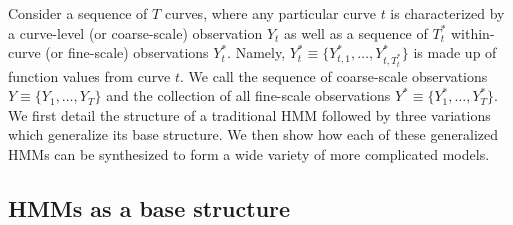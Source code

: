 
Consider a sequence of $T$ curves, where any particular curve $t$ is characterized by a curve-level (or coarse-scale) observation $Y_t$ as well as a sequence of $T^*_t$ within-curve (or fine-scale) observations $Y^*_{t}$. Namely, $Y^*_{t} \equiv \big\{Y^*_{t,1},\ldots,Y^*_{t,T^*_t}\big\}$ is made up of function values from curve $t$. We call the sequence of coarse-scale observations $Y \equiv \big\{Y_1, \ldots, Y_T\big\}$ and the collection of all fine-scale observations $Y^* \equiv \big\{Y^*_1,\ldots,Y^*_T \big\}$. We first detail the structure of a traditional HMM followed by three variations which generalize its base structure. We then show how each of these generalized HMMs can be synthesized to form a wide variety of more complicated models.


\subsection{HMMs as a base structure}

